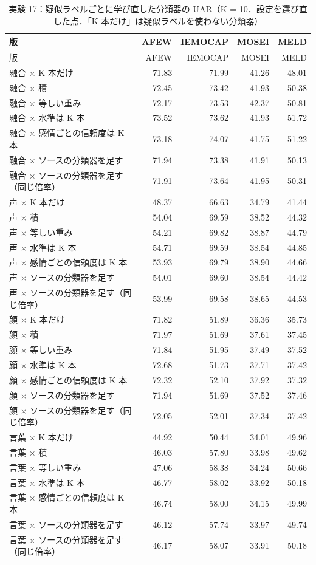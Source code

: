 \begin{longtable}{>{\raggedright}p{8.2cm}rrrr}
\caption{実験 17：疑似ラベルごとに学び直した分類器の UAR（K = 10．設定を選び直した点．「K 本だけ」は疑似ラベルを使わない分類器）}\\
\toprule
版 & AFEW & IEMOCAP & MOSEI & MELD \\
\midrule
\endfirsthead
\toprule
版 & AFEW & IEMOCAP & MOSEI & MELD \\
\midrule
\endhead
\bottomrule
\endfoot

融合 × K 本だけ & 71.83 & 71.99 & 41.26 & 48.01 \\
融合 × 積 & 72.45 & 73.42 & 41.93 & 50.38 \\
融合 × 等しい重み & 72.17 & 73.53 & 42.37 & 50.81 \\
融合 × 水準は K 本 & 73.52 & 73.62 & 41.93 & 51.72 \\
融合 × 感情ごとの信頼度は K 本 & 73.18 & 74.07 & 41.75 & 51.22 \\
融合 × ソースの分類器を足す & 71.94 & 73.38 & 41.91 & 50.13 \\
融合 × ソースの分類器を足す（同じ倍率） & 71.91 & 73.64 & 41.95 & 50.31 \\
\midrule
声 × K 本だけ & 48.37 & 66.63 & 34.79 & 41.44 \\
声 × 積 & 54.04 & 69.59 & 38.52 & 44.32 \\
声 × 等しい重み & 54.21 & 69.82 & 38.87 & 44.79 \\
声 × 水準は K 本 & 54.71 & 69.59 & 38.54 & 44.85 \\
声 × 感情ごとの信頼度は K 本 & 53.93 & 69.79 & 38.90 & 44.66 \\
声 × ソースの分類器を足す & 54.01 & 69.60 & 38.54 & 44.42 \\
声 × ソースの分類器を足す（同じ倍率） & 53.99 & 69.58 & 38.65 & 44.53 \\
\midrule
顔 × K 本だけ & 71.82 & 51.89 & 36.36 & 35.73 \\
顔 × 積 & 71.97 & 51.69 & 37.61 & 37.45 \\
顔 × 等しい重み & 71.84 & 51.95 & 37.49 & 37.52 \\
顔 × 水準は K 本 & 72.68 & 51.73 & 37.71 & 37.42 \\
顔 × 感情ごとの信頼度は K 本 & 72.32 & 52.10 & 37.92 & 37.32 \\
顔 × ソースの分類器を足す & 71.94 & 51.69 & 37.52 & 37.46 \\
顔 × ソースの分類器を足す（同じ倍率） & 72.05 & 52.01 & 37.34 & 37.42 \\
\midrule
言葉 × K 本だけ & 44.92 & 50.44 & 34.01 & 49.96 \\
言葉 × 積 & 46.03 & 57.80 & 33.98 & 49.62 \\
言葉 × 等しい重み & 47.06 & 58.38 & 34.24 & 50.66 \\
言葉 × 水準は K 本 & 46.77 & 58.02 & 33.92 & 50.18 \\
言葉 × 感情ごとの信頼度は K 本 & 46.74 & 58.00 & 34.15 & 49.99 \\
言葉 × ソースの分類器を足す & 46.12 & 57.74 & 33.97 & 49.74 \\
言葉 × ソースの分類器を足す（同じ倍率） & 46.17 & 58.07 & 33.91 & 50.18 \\
\midrule
\end{longtable}
